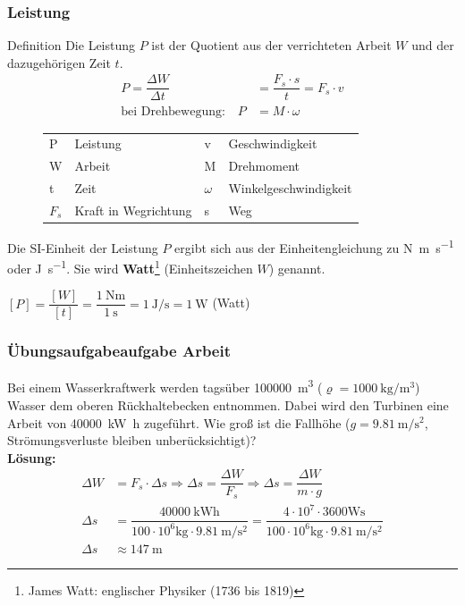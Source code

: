 \documentclass{beamer}
\begin{document}
{
  \frametitle{Leistung}
\begin{block}{Definition}
Die Leistung $P$ ist der Quotient aus der verrichteten Arbeit $W$ und der dazugehörigen Zeit $t$.\\
\begin{align}
P=\dfrac{\Delta W}{\Delta t}&=\dfrac{F_s\cdot s}{t}=F_s\cdot v\\
\text{bei Drehbewegung:}\quad P&=M\cdot\omega
\end{align}
\end{block}
\begin{figure}
\begin{tabular}{l l l l}
P & Leistung & v & Geschwindigkeit \\ 
W & Arbeit & M & Drehmoment \\ 
t & Zeit & $\omega$ & Winkelgeschwindigkeit \\ 
$F_s$ & Kraft in Wegrichtung & s & Weg \\ 
\end{tabular}
\end{figure}
Die SI-Einheit der Leistung $P$ ergibt sich aus der Einheitengleichung zu \si{\newton\meter\per\second} oder \si{\joule\per\second}. Sie wird \textbf{Watt}\footnote{James Watt: englischer Physiker (1736 bis 1819)}  (Einheitszeichen $W$) genannt. 
	\begin{tcolorbox}	  
	  $[P]=\dfrac{[W]}{[t]}=\dfrac{\SI{1}{\newton\meter}}{\SI{1}{\second}}=\SI{1}{\joule\per\second}=\SI{1}{\watt}$ (Watt)
	\end{tcolorbox}
}

\frame
{
  \frametitle{Übungsaufgabeaufgabe Arbeit}
{
Bei einem Wasserkraftwerk werden tagsüber \SI{100000}{\cubic\meter} ($\varrho=\SI{1000}{\kilogram\per\cubic\meter}$) Wasser dem oberen Rückhaltebecken entnommen. Dabei wird den Turbinen eine Arbeit von \SI{40000}{\kilo\watt\hour} zugeführt. Wie groß ist die Fallhöhe ($g=\SI{9,81}{\meter\per\square\second}$, Strömungsverluste bleiben unberücksichtigt)?\\
}
{
\textbf{Lösung:}	
	\begin{align*}
	\Delta W&=F_s\cdot \Delta s\Rightarrow\Delta s=\dfrac{\Delta W}{F_s}\Rightarrow\Delta s=\dfrac{\Delta W}{m\cdot g}\\
	\Delta s&=\dfrac{\SI{40000}{\kilo\watt\hour}}{100\cdot 10^6\si{\kilo\gram}\cdot \SI{9,81}{\meter\per\square\second}}=\dfrac{4\cdot 10^7\cdot 3600\si{\watt\second}}{100\cdot 10^6\si{\kilo\gram}\cdot \SI{9,81}{\meter\per\square\second}}\\
	\Delta s&\approx\SI{147}{\meter}
	\end{align*}
}
}
\end{document}

